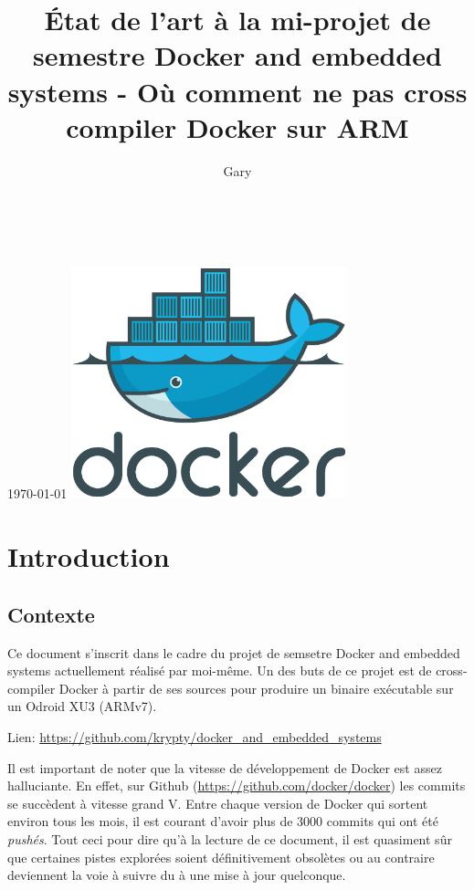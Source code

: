 \documentclass[11pt,a4paper,oneside]{article}
\title{État de l'art à la mi-projet de semestre Docker and embedded systems - Où comment ne pas cross compiler Docker sur ARM}
\author{Gary \bsc{Marigliano}}
\begin{document}
\begin{titlepage}
  \centering
  \vfill
  \LARGE \thetitle\\[0.8cm]

  \Large \theauthor\\[0.8cm]

  \normalsize \today
  \vfill
  \includegraphics[width=8cm]{img/docker_logo} %
  \vfill
  \vfill
\end{titlepage}

\newpage
\tableofcontents
\newpage
{}

\chapter{Introduction}

\section{Contexte}

Ce document s'inscrit dans le cadre du projet de semsetre Docker and embedded systems actuellement réalisé par moi-même. Un des buts de ce projet est de cross-compiler Docker à partir de ses sources pour produire un binaire exécutable sur un Odroid XU3 (ARMv7).

Lien: \url{https://github.com/krypty/docker_and_embedded_systems}

Il est important de noter que la vitesse de développement de Docker est assez halluciante. En effet, sur Github (\url{https://github.com/docker/docker}) les commits se succèdent à vitesse grand V. Entre chaque version de Docker qui sortent environ tous les mois, il est courant d'avoir plus de 3000 commits qui ont été \emph{pushés}. Tout ceci pour dire qu'à la lecture de ce document, il est quasiment sûr que certaines pistes explorées soient définitivement obsolètes ou au contraire deviennent la voie à suivre du à une mise à jour quelconque.
\end{document}
